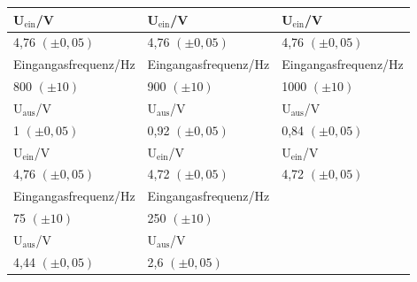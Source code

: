 \documentclass[12pt]{scrartcl}
\begin{document}
\begin{table}[htbp]
\begin{center}
\begin{tabular}{|l|l|l|}
U$_\text{ein}$/V & U$_\text{ein}$/V & U$_\text{ein}$/V \\ \hline
4,76 $(\pm 0,05)$ & 4,76 $(\pm 0,05)$ & 4,76 $(\pm 0,05)$ \\ \hline \hline
Eingangasfrequenz/Hz & Eingangasfrequenz/Hz & Eingangasfrequenz/Hz \\ \hline
800 $(\pm 10)$ & 900 $(\pm 10)$ & 1000 $(\pm 10)$ \\ \hline
U$_\text{aus}$/V & U$_\text{aus}$/V & U$_\text{aus}$/V \\ \hline
1 $(\pm 0,05)$ & 0,92 $(\pm 0,05)$ & 0,84 $(\pm 0,05)$ \\ \hline
U$_\text{ein}$/V & U$_\text{ein}$/V & U$_\text{ein}$/V \\ \hline
4,76 $(\pm 0,05)$ & 4,72 $(\pm 0,05)$ & 4,72 $(\pm 0,05)$ \\ \hline \hline
Eingangasfrequenz/Hz & Eingangasfrequenz/Hz &  \\ \hline
75 $(\pm 10)$ & 250 $(\pm 10)$ &  \\ \hline
U$_\text{aus}$/V & U$_\text{aus}$/V &  \\ \hline
4,44 $(\pm 0,05)$ & 2,6 $(\pm 0,05)$ &  \\ \hline
\end{tabular}
\end{center}
\label{tab:2.3}
\end{table}
\end{document}
